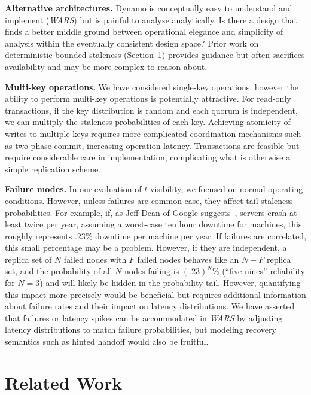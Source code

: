 \documentclass{vldb}
\newcommand{\sectionskip}{-0em}
\begin{document}
\textbf{Alternative architectures.} Dynamo is conceptually easy to
understand and implement (\textit{WARS}) but is painful to analyze
analytically.  Is there a design that finds a better middle ground
between operational elegance and simplicity of analysis within the
eventually consistent design space?  Prior work on deterministic
bounded staleness (Section~\ref{sec:relatedwork}) provides guidance
but often sacrifices availability and may be more complex to reason
about.

\textbf{Multi-key operations.} We have considered single-key
operations, however the ability to perform multi-key operations is
potentially attractive.  For read-only transactions, if the key
distribution is random and each quorum is independent, we can multiply
the staleness probabilities of each key.  Achieving atomicity of
writes to multiple keys requires more complicated coordination
mechanisms such as two-phase commit, increasing operation latency.
Transactions are feasible but require considerable care in
implementation, complicating what is otherwise a simple replication
scheme.

\textbf{Failure modes.} In our evaluation of $t$-visibility, we
focused on normal operating conditions. However, unless failures are
common-case, they affect tail staleness probabilities.  For example,
if, as Jeff Dean of Google suggests~\cite{dean-keynote}, servers crash
at least twice per year, assuming a worst-case ten hour downtime for
machines, this roughly represents .23\% downtime per machine per year.
If failures are correlated, this small percentage may be a
problem. However, if they are independent, a replica set of $N$ failed
nodes with $F$ failed nodes behaves like an $N-F$ replica set, and the
probability of all $N$ nodes failing is $(.23)^N$\% (``five nines''
reliability for $N$$=$$3$) and will likely be hidden in the
probability tail.  However, quantifying this impact more precisely
would be beneficial but requires additional information about failure
rates and their impact on latency distributions.  We have asserted
that failures or latency spikes can be accommodated in \textit{WARS}
by adjusting latency distributions to match failure probabilities, but
modeling recovery semantics such as hinted handoff would also be
fruitful.

\vspace{\sectionskip}\section{Related Work}
\label{sec:relatedwork}
\end{document}
